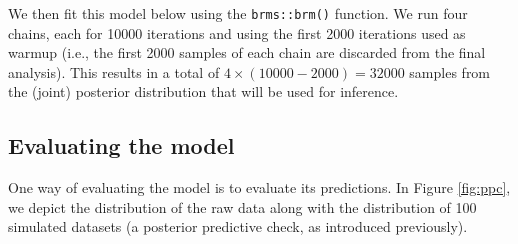 \documentclass[
  11pt,
  english,
  ,doc,floatsintext]{apa6}
\newenvironment{Shaded}{}{}
\newcommand{\AttributeTok}[1]{\textcolor[rgb]{0.49,0.56,0.16}{#1}}
\newcommand{\CommentTok}[1]{\textcolor[rgb]{0.38,0.63,0.69}{\textit{#1}}}
\newcommand{\ConstantTok}[1]{\textcolor[rgb]{0.53,0.00,0.00}{#1}}
\newcommand{\DecValTok}[1]{\textcolor[rgb]{0.25,0.63,0.44}{#1}}
\newcommand{\FloatTok}[1]{\textcolor[rgb]{0.25,0.63,0.44}{#1}}
\newcommand{\FunctionTok}[1]{\textcolor[rgb]{0.02,0.16,0.49}{#1}}
\newcommand{\NormalTok}[1]{#1}
\newcommand{\OtherTok}[1]{\textcolor[rgb]{0.00,0.44,0.13}{#1}}
\newcommand{\SpecialCharTok}[1]{\textcolor[rgb]{0.25,0.44,0.63}{#1}}
\newcommand{\StringTok}[1]{\textcolor[rgb]{0.25,0.44,0.63}{#1}}
\begin{document}
\begin{Shaded}
\end{Shaded}

We then fit this model below using the \texttt{brms::brm()} function. We run four chains, each for 10000 iterations and using the first 2000 iterations used as warmup (i.e., the first 2000 samples of each chain are discarded from the final analysis). This results in a total of \(4 \times (10000 - 2000) = 32000\) samples from the (joint) posterior distribution that will be used for inference.

\hypertarget{evaluating-the-model}{%
\subsection{Evaluating the model}\label{evaluating-the-model}}

One way of evaluating the model is to evaluate its predictions. In Figure \ref{fig:ppc}, we depict the distribution of the raw data along with the distribution of 100 simulated datasets (a posterior predictive check, as introduced previously).
\end{document}
